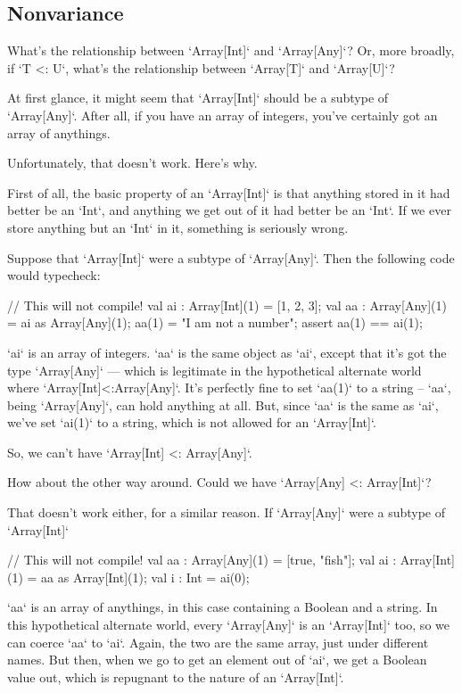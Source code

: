 \subsection{Nonvariance}
\label{sect:ArrayNonvariance}

What's the relationship between \xcd`Array[Int]` and \xcd`Array[Any]`?  Or,
more broadly, if \xcd`T <: U`, what's the relationship between \xcd`Array[T]`
and \xcd`Array[U]`?

At first glance, it might seem that \xcd`Array[Int]` should be a subtype of
\xcd`Array[Any]`.  After all, if you have an array of integers, you've
certainly got an array of anythings. 

Unfortunately, that doesn't work.  Here's why. 

First of all, the basic property of an \xcd`Array[Int]` is that anything
stored in it had better be an \xcd`Int`, and anything we get out of it had
better be an \xcd`Int`.  If we ever store anything but an
\xcd`Int` in it, something is seriously wrong.  

Suppose that \xcd`Array[Int]` were a subtype of \xcd`Array[Any]`.  Then the
following code would typecheck:
\begin{xten}
// This will not compile!
val ai : Array[Int](1) = [1, 2, 3];
val aa : Array[Any](1) = ai as Array[Any](1);
aa(1) = "I am not a number";
assert aa(1) == ai(1);
\end{xten}
\xcd`ai` is an array of integers.  \xcd`aa` is the same object as \xcd`ai`,
except that it's got the type \xcd`Array[Any]` --- which is legitimate in the
hypothetical alternate world where \xcd`Array[Int]<:Array[Any]`.  
It's perfectly fine to set \xcd`aa(1)` to a string -- \xcd`aa`, being
\xcd`Array[Any]`, can hold anything at all.  But, since \xcd`aa` is the same
as \xcd`ai`, we've set \xcd`ai(1)` to a string, which is not allowed for an
\xcd`Array[Int]`. 

So, we can't have \xcd`Array[Int] <: Array[Any]`.

How about the other way around.  Could we have \xcd`Array[Any] <: Array[Int]`?  

That doesn't work either, for a similar reason.   If 
\xcd`Array[Any]` were a subtype of \xcd`Array[Int]`
\begin{xten}
// This will not compile!
val aa : Array[Any](1) = [true, "fish"];
val ai : Array[Int](1) = aa as Array[Int](1);
val i  : Int = ai(0);
\end{xten}
\xcd`aa` is an array of anythings, in this case containing a Boolean and a
string. In this hypothetical alternate world, every \xcd`Array[Any]` is an
\xcd`Array[Int]` too, so we can coerce \xcd`aa` to \xcd`ai`. Again, the two
are the same array, just under different names.  But then, when
we go to get an element out of \xcd`ai`, we get a Boolean value out, which is
repugnant to the nature of an \xcd`Array[Int]`.  

